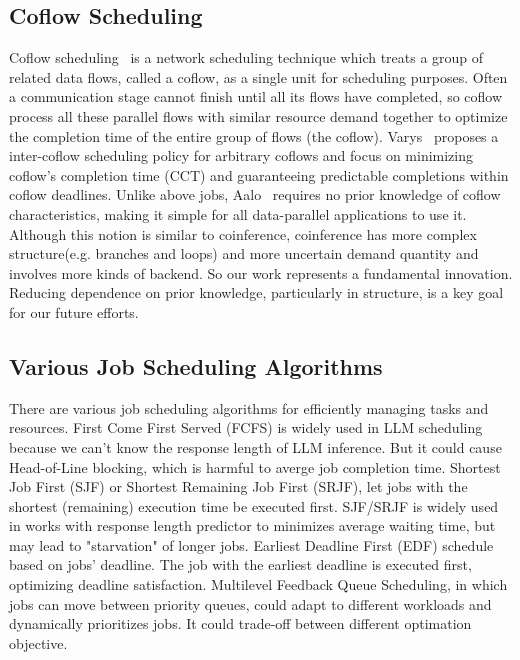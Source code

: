\subsection{Coflow Scheduling}
Coflow scheduling~\cite{chowdhury2012coflow} is a network scheduling technique which treats a group of related data flows, called a coflow, as a single unit for scheduling purposes. Often a communication stage cannot finish until all its flows have completed, so coflow process all these parallel flows with similar resource demand together to optimize the completion time of the entire group of flows (the coflow). Varys~\cite{chowdhury2014efficient}  proposes a inter-coflow scheduling policy for arbitrary coflows and focus on minimizing coflow’s completion time (CCT) and guaranteeing predictable completions within coflow deadlines. Unlike above jobs, Aalo~\cite{chowdhury2015efficient} requires no prior knowledge of coflow characteristics, making it simple for all data-parallel applications to use it. Although this notion is similar to coinference, coinference has more complex structure(e.g. branches and loops)
 and more uncertain demand quantity and involves more kinds of backend. So our work represents a fundamental innovation. Reducing dependence on prior knowledge, particularly in structure, is a key goal for our future efforts.
 

\subsection{Various Job Scheduling Algorithms}
There are various job scheduling algorithms for efficiently managing tasks and resources. First Come First Served (FCFS) is widely used in LLM scheduling because we can't know the response length of LLM inference. But it could cause Head-of-Line blocking, which is harmful to averge job completion time. Shortest Job First (SJF) or Shortest Remaining Job First (SRJF), let jobs with the shortest (remaining) execution time be executed first. SJF/SRJF is widely used in works with response length predictor to minimizes average waiting time, but may lead to "starvation" of longer jobs. Earliest Deadline First (EDF) schedule based on jobs' deadline. The job with the earliest deadline is executed first, optimizing deadline satisfaction. Multilevel Feedback Queue Scheduling, in which jobs can move between priority queues, could adapt to different workloads and dynamically prioritizes jobs. It could trade-off between different optimation objective.




